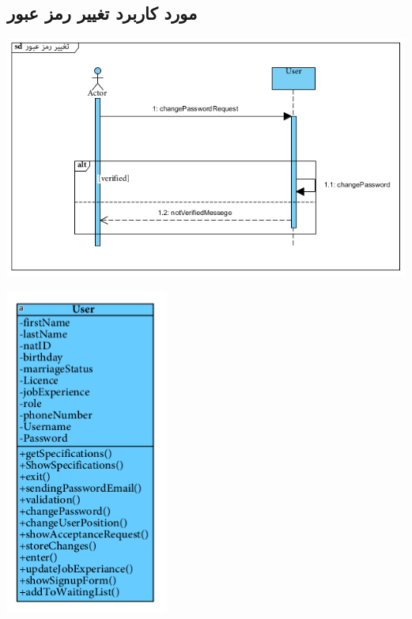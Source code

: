\newpage
\vspace{2cm}
\subsection*{مورد کاربرد تغییر رمز عبور}
\vspace{2cm}
\begin{center}
\includegraphics[width=\textwidth]{SequenceDiagrams/12.png}
\end{center}

\newpage
\vspace{2cm}
\begin{center}
\includegraphics[width=0.4\textwidth]{SequenceClasses/12.png}
\end{center}

\newpage
\vspace{2cm}
